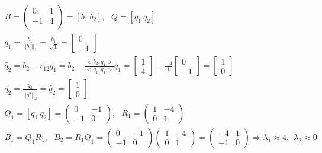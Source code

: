 \documentclass[main.tex]{subfiles}
\begin{document}
    \begin{gather*}
        B = \begin{pmatrix}
                0  & 1\\
                -1 & 4\\
        \end{pmatrix}
        = [b_1 ~ b_2], ~~~ Q = [q_1 ~ q_2]\\
        q_1 = \frac{b_1}{||b_1||_2} = \frac{b_1}{\sqrt{1}} =
        \begin{bmatrix}
            0\\
            -1
        \end{bmatrix}\\
        \tilde{q_2} = b_2 - r_{12} q_1 = b_2 - \frac{<b_2, q_1>}{<q_1, q_1>} q_1 =
        \begin{bmatrix}
            1\\
            4
        \end{bmatrix}
        - \frac{-4}{1}
        \begin{bmatrix}
            0\\
            -1
        \end{bmatrix} =
        \begin{bmatrix}
            1\\
            0
        \end{bmatrix}\\
        q_2 = \frac{\tilde{q_2}}{||\tilde{q^2}||_2} = \tilde{q_2} =
        \begin{bmatrix}
            1\\
            0
        \end{bmatrix}\\
        Q_1 = [q_1 ~ q_2] =
        \begin{pmatrix}
            0 & -1\\
            -1 & 0
        \end{pmatrix}, ~~~
        R_1 =
        \begin{pmatrix}
            1 & -4\\
            0 & 1
        \end{pmatrix}\\
        B_1 = Q_1 R_1, ~~~ B_2 = R_1 Q_1 =
        \begin{pmatrix}
            0 & -1\\
            -1 & 0
        \end{pmatrix}
        \begin{pmatrix}
            1 & -4\\
            0 & 1
        \end{pmatrix}
        =
        \begin{pmatrix}
            -4 & 1\\
            -1 & 0
        \end{pmatrix}
        \Rightarrow
        \lambda_1 \approx 4, ~~ \lambda_2 \approx 0
    \end{gather*}
\end{document}

